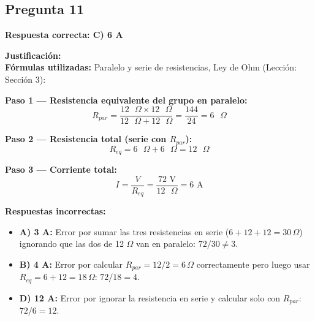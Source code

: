 \begin{respuestabox}
\subsection{Pregunta 11}
\textcolor{verdecorrecto}{\textbf{Respuesta correcta: C) 6 A}}

\textbf{Justificación:}\\
\textbf{Fórmulas utilizadas:} Paralelo y serie de resistencias, Ley de Ohm (Lección: Sección 3):

\textbf{Paso 1 — Resistencia equivalente del grupo en paralelo:}
$$R_{par} = \frac{12 \text{ }\Omega \times 12 \text{ }\Omega}{12 \text{ }\Omega + 12 \text{ }\Omega} = \frac{144}{24} = 6 \text{ }\Omega$$

\textbf{Paso 2 — Resistencia total (serie con $R_{par}$):}
$$R_{eq} = 6 \text{ }\Omega + 6 \text{ }\Omega = 12 \text{ }\Omega$$

\textbf{Paso 3 — Corriente total:}
$$I = \frac{V}{R_{eq}} = \frac{72 \text{ V}}{12 \text{ }\Omega} = 6 \text{ A}$$

\textbf{Respuestas incorrectas:}
\begin{itemize}
    \item \textbf{A) 3 A:} Error por sumar las tres resistencias en serie ($6+12+12 = 30\,\Omega$) ignorando que las dos de 12 $\Omega$ van en paralelo: $72/30 \neq 3$.
    \item \textbf{B) 4 A:} Error por calcular $R_{par} = 12/2 = 6\,\Omega$ correctamente pero luego usar $R_{eq} = 6+12 = 18\,\Omega$: $72/18 = 4$.
    \item \textbf{D) 12 A:} Error por ignorar la resistencia en serie y calcular solo con $R_{par}$: $72/6 = 12$.
\end{itemize}
\end{respuestabox}

